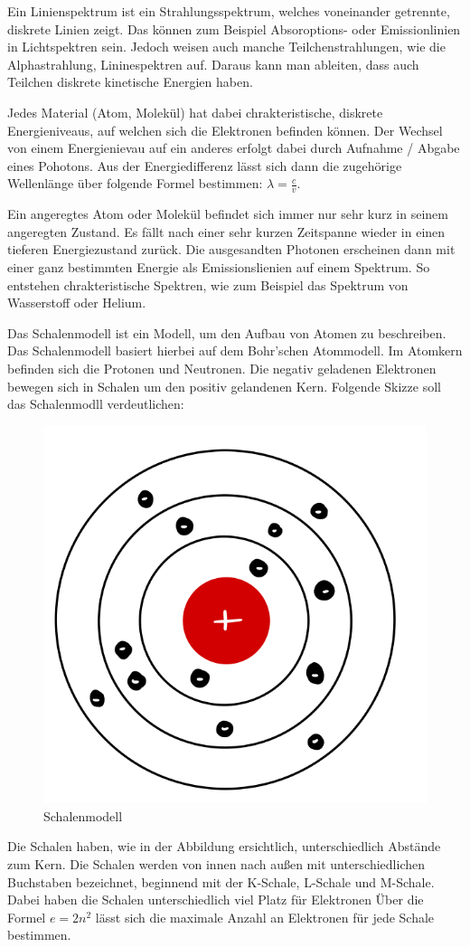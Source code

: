 \documentclass{article}
\begin{document}
\cite{chemie.de}
\cite[1050--1051]{Physik}
\cite{studyfix}

Ein Linienspektrum ist ein Strahlungsspektrum, welches voneinander getrennte, diskrete Linien zeigt. Das können zum Beispiel Absoroptions- oder Emissionlinien in Lichtspektren sein. Jedoch weisen auch manche Teilchenstrahlungen, wie die Alphastrahlung, Lininespektren auf. Daraus kann man ableiten, dass auch Teilchen diskrete kinetische Energien haben.

Jedes Material (Atom, Molekül) hat dabei chrakteristische, diskrete Energieniveaus, auf welchen sich die Elektronen befinden können. Der Wechsel von einem Energienievau auf ein anderes erfolgt dabei durch Aufnahme / Abgabe eines Pohotons. Aus der Energiedifferenz lässt sich dann die zugehörige Wellenlänge über folgende Formel bestimmen: $\lambda=\frac{c}{v}$.

Ein angeregtes Atom oder Molekül befindet sich immer nur sehr kurz in seinem angeregten Zustand. Es fällt nach einer sehr kurzen Zeitspanne wieder in einen tieferen Energiezustand zurück. Die ausgesandten Photonen erscheinen dann mit einer ganz bestimmten Energie als Emissionslienien auf einem Spektrum. So entstehen chrakteristische Spektren, wie zum Beispiel das Spektrum von Wasserstoff oder Helium.


Das Schalenmodell ist ein Modell, um den Aufbau von Atomen zu beschreiben. Das Schalenmodell basiert hierbei auf dem Bohr'schen Atommodell. Im Atomkern befinden sich die Protonen und Neutronen. Die negativ geladenen Elektronen bewegen sich in Schalen um den positiv gelandenen Kern. Folgende Skizze soll das Schalenmodll verdeutlichen:

\begin{figure}[H]
    \centering
    \includegraphics[width=0.3\linewidth]{Abbildungen/Schalenmodell.pdf}
    \caption{Schalenmodell}
\end{figure}

Die Schalen haben, wie in der Abbildung ersichtlich, unterschiedlich Abstände zum Kern. Die Schalen werden von innen nach außen mit unterschiedlichen Buchstaben bezeichnet, beginnend mit der K-Schale, L-Schale und M-Schale. Dabei haben die Schalen unterschiedlich viel Platz für Elektronen  Über die Formel $e=2n^2$ lässt sich die maximale Anzahl an Elektronen für jede Schale bestimmen.
\end{document}
